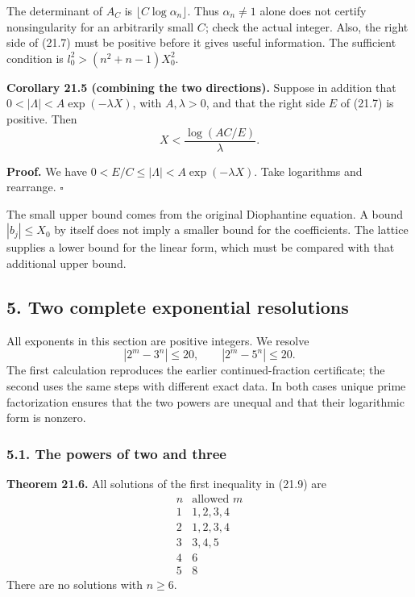 \documentclass[
  11pt,
  a4paper,
]{article}
\begin{document}
The determinant of \(A_C\) is \(\lfloor C\log\alpha_n\rfloor\). Thus
\(\alpha_n\ne1\) alone does not certify nonsingularity for an
arbitrarily small \(C\); check the actual integer. Also, the right side
of (21.7) must be positive before it gives useful information. The
sufficient condition is \(l_0^2>(n^2+n-1)X_0^2\).

\textbf{Corollary 21.5 (combining the two directions).} Suppose in
addition that \(0<|\Lambda|<A\exp(-\lambda X)\), with \(A,\lambda>0\),
and that the right side \(E\) of (21.7) is positive. Then \[
 X<\frac{\log(AC/E)}{\lambda}.
 \tag{21.8}
\]

\textbf{Proof.} We have \(0<E/C\le|\Lambda|<A\exp(-\lambda X)\). Take
logarithms and rearrange. \(\square\)

The small upper bound comes from the original Diophantine equation. A
bound \(|b_j|\le X_0\) by itself does not imply a smaller bound for the
coefficients. The lattice supplies a lower bound for the linear form,
which must be compared with that additional upper bound.

\subsection{5. Two complete exponential
resolutions}\label{two-complete-exponential-resolutions}

All exponents in this section are positive integers. We resolve \[
 |2^m-3^n|\le20,\qquad |2^m-5^n|\le20.
 \tag{21.9}
\] The first calculation reproduces the earlier continued-fraction
certificate; the second uses the same steps with different exact data.
In both cases unique prime factorization ensures that the two powers are
unequal and that their logarithmic form is nonzero.

\subsubsection{5.1. The powers of two and
three}\label{the-powers-of-two-and-three}

\textbf{Theorem 21.6.} All solutions of the first inequality in (21.9)
are \[
\begin{array}{c|l}
n&\text{allowed }m\\ \hline
1&1,2,3,4\\
2&1,2,3,4\\
3&3,4,5\\
4&6\\
5&8
\end{array}
\tag{21.10}
\] There are no solutions with \(n\ge6\).
\end{document}
